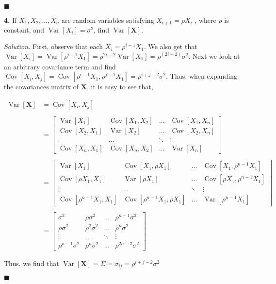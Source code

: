 \documentclass{article}
\newcommand{\Var}{\operatorname{Var}} %
\newcommand{\Cov}{\operatorname{Cov}}
\begin{document}
\begin{flushright}
\(\blacksquare\) 
\end{flushright}

\newpage
\textbf{4.} If \(X_1, X_2, \ldots, X_n \) are random variables satisfying \(X_{i+1} = \rho X_i \) , where \(\rho\) is constant, and \(\Var[X_i]=\sigma^2\), find \( \Var[\textbf{X}] \).

\vspace{2mm}

\textit{Solution.}  First, observe that each \(X_i = \rho^{i-1} X_1\). We also get that \(\Var[X_i] = \Var[\rho^{i-1}X_1] = \rho^{2i - 2} \Var[X_1] = \rho^{(2i - 2)} \sigma^2 \). Next we look at an arbitrary covariance term and find \(\Cov[X_i,X_j] = \Cov[\rho^{i-1} X_1, \rho^{j-1}X_1] = \rho^{i+j-2} \sigma^2 \). Thus, when expanding the covariances matrix of  \(\textbf{X}\), it is easy to see that, 

\begin{align*}
\Var[\textbf{X}] &= \Cov[X_i,X_j]\\
\\
 &= \begin{bmatrix}
\Var[{X}_1] & \Cov[{X}_1,{X}_2] & \ldots & \Cov[{X}_1,{X}_n] \\
\Cov[X_2,X_1] & \Var[X_2] & \ldots & \Cov[X_2, X_n] \\
\vdots & \hdots & \ddots & \vdots \\
\Cov[X_n,X_1] & \Cov[X_n,X_2] & \hdots & \Var[X_n] 
\end{bmatrix} \\
\\
 &= \begin{bmatrix}
\Var[{X}_1] & \Cov[{X}_1, \rho X_1] & \ldots & \Cov[{X}_1,\rho^{n-1}X_1] \\
\Cov[\rho X_1,X_1] & \Var[\rho X_1] & \ldots & \Cov[\rho X_1, \rho^{n-1}X_1] \\
\vdots & \hdots & \ddots & \vdots \\
\Cov[\rho^{n-1}X_1,X_1] & \Cov[\rho^{n-1}X_1,\rho X_1] & \hdots & \Var[\rho^{n-1}X_1] 
\end{bmatrix} \\
\\
 &= \begin{bmatrix}
 \sigma^2 & \rho \sigma^2 & \ldots &\rho^{n-1}\sigma^2 \\
\rho \sigma^2 & \rho^2 \sigma^2 & \ldots & \rho^n \sigma^2 \\
\vdots & \hdots & \ddots & \vdots \\
\rho^{n-1}\sigma^2& \rho^{n}\sigma^2& \hdots & \rho^{2n-2} \sigma^2
\end{bmatrix}
\end{align*}

Thus, we find that \(\Var[\textbf{X}] = \Sigma = \sigma_{ij} = \rho^{i+j-2} \sigma^2 \)

\begin{flushright}
\(\blacksquare\) 
\end{flushright}

\end{document}
